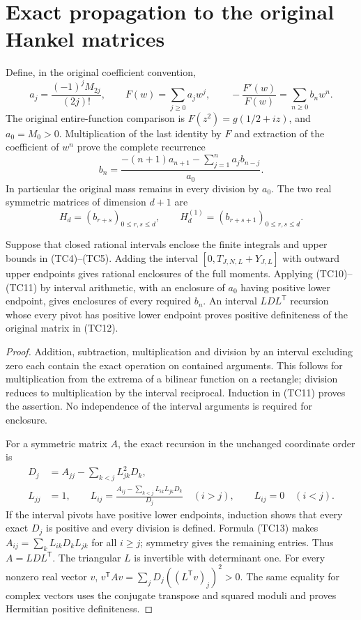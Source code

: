 \section{Exact propagation to the original Hankel matrices}
Define, in the original coefficient convention,
\[
a_j=\frac{(-1)^jM_{2j}}{(2j)!},\qquad
F(w)=\sum_{j\ge0}a_jw^j,\qquad
-\frac{F'(w)}{F(w)}=\sum_{n\ge0}b_nw^n.
\tag{TC10}
\]
The original entire-function comparison is
$F(z^2)=g(1/2+iz)$, and $a_0=M_0>0$. Multiplication of the
last identity by $F$ and extraction of the coefficient of $w^n$
prove the complete recurrence
\[
b_n=
\frac{-(n+1)a_{n+1}-\sum_{j=1}^na_jb_{n-j}}{a_0}.
\tag{TC11}
\]
In particular the original mass remains in every division by $a_0$.
The two real symmetric matrices of dimension $d+1$ are
\[
H_d=(b_{r+s})_{0\le r,s\le d},\qquad
H_d^{(1)}=(b_{r+s+1})_{0\le r,s\le d}.
\tag{TC12}
\]

\begin{proposition}
Suppose that closed rational intervals enclose the finite integrals
and upper bounds in (TC4)--(TC5). Adding the interval
$[0,T_{J,N,L}+Y_{J,L}]$ with outward upper endpoints gives rational
enclosures of the full moments. Applying (TC10)--(TC11) by interval
arithmetic, with an enclosure of $a_0$ having positive lower
endpoint, gives enclosures of every required $b_n$.
An interval $LDL^{\mathsf T}$ recursion whose every pivot has
positive lower endpoint proves positive definiteness of the
original matrix in (TC12).
\end{proposition}
\begin{proof}
Addition, subtraction, multiplication and division by an interval
excluding zero each contain the exact operation on contained
arguments. This follows for multiplication from the extrema of a
bilinear function on a rectangle; division reduces to multiplication
by the interval reciprocal. Induction in (TC11) proves the assertion.
No independence of the interval arguments is required for enclosure.

For a symmetric matrix $A$, the exact recursion in the unchanged
coordinate order is
\[
\begin{split}
D_j&=A_{jj}-\sum_{k<j}L_{jk}^2D_k,\\
L_{jj}&=1,\qquad
L_{ij}=\frac{A_{ij}-\sum_{k<j}L_{ik}L_{jk}D_k}{D_j}
\quad(i>j),\qquad L_{ij}=0\quad(i<j).
\end{split}
\tag{TC13}
\]
If the interval pivots have positive lower endpoints, induction
shows that every exact $D_j$ is positive and every division is
defined. Formula (TC13) makes $A_{ij}=\sum_kL_{ik}D_kL_{jk}$
for all $i\ge j$; symmetry gives the remaining entries.
Thus $A=LDL^{\mathsf T}$. The triangular $L$ is invertible with
determinant one. For every nonzero real vector $v$,
$v^{\mathsf T}Av=\sum_jD_j((L^{\mathsf T}v)_j)^2>0$.
The same equality for complex vectors uses the conjugate transpose
and squared moduli and proves Hermitian positive definiteness.
\end{proof}

